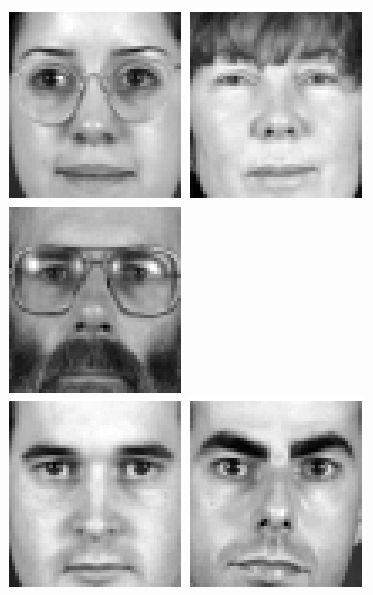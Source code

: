 \begin{figure}
\begin{center}
\includegraphics[scale=0.12]{ch4/figures/XM2VTS_6.png}
\includegraphics[scale=0.12]{ch4/figures/XM2VTS_7.png}
\includegraphics[scale=0.12]{ch4/figures/XM2VTS_8.png}\\
\includegraphics[scale=0.12]{ch4/figures/XM2VTS_9.png}
\includegraphics[scale=0.12]{ch4/figures/XM2VTS_10.png}

\end{center}
\end{figure}
